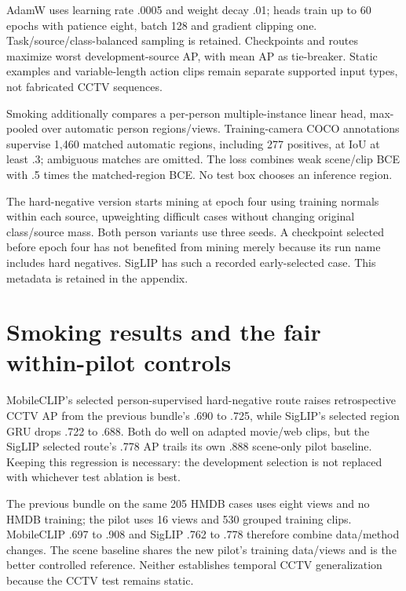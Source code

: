 AdamW uses learning rate .0005 and weight decay .01; heads train up to 60 epochs with patience eight, batch 128 and gradient clipping one. Task/source/class-balanced sampling is retained. Checkpoints and routes maximize worst development-source AP, with mean AP as tie-breaker. Static examples and variable-length action clips remain separate supported input types, not fabricated CCTV sequences.

Smoking additionally compares a per-person multiple-instance linear head, max-pooled over automatic person regions/views. Training-camera COCO annotations supervise 1,460 matched automatic regions, including 277 positives, at IoU at least .3; ambiguous matches are omitted. The loss combines weak scene/clip BCE with .5 times the matched-region BCE. No test box chooses an inference region.

The hard-negative version starts mining at epoch four using training normals within each source, upweighting difficult cases without changing original class/source mass. Both person variants use three seeds. A checkpoint selected before epoch four has not benefited from mining merely because its run name includes hard negatives. SigLIP has such a recorded early-selected case. This metadata is retained in the appendix.

\section{Smoking results and the fair within-pilot controls}

MobileCLIP's selected person-supervised hard-negative route raises retrospective CCTV AP from the previous bundle's .690 to .725, while SigLIP's selected region GRU drops .722 to .688. Both do well on adapted movie/web clips, but the SigLIP selected route's .778 AP trails its own .888 scene-only pilot baseline. Keeping this regression is necessary: the development selection is not replaced with whichever test ablation is best.

The previous bundle on the same 205 HMDB cases uses eight views and no HMDB training; the pilot uses 16 views and 530 grouped training clips. MobileCLIP .697 to .908 and SigLIP .762 to .778 therefore combine data/method changes. The scene baseline shares the new pilot's training data/views and is the better controlled reference. Neither establishes temporal CCTV generalization because the CCTV test remains static.

